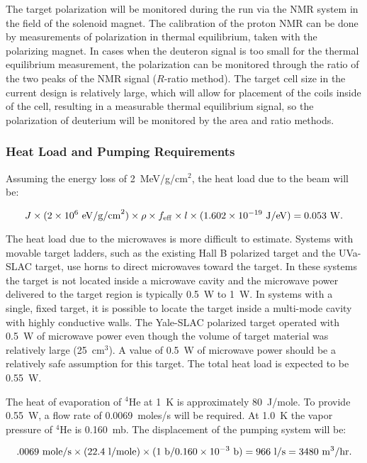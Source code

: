 The target polarization will be monitored during the run via the NMR system 
in the field of the solenoid magnet. The calibration of the proton NMR can be 
done by measurements of polarization in thermal equilibrium, taken with the 
polarizing magnet. In cases when the deuteron signal is too small for the 
thermal equilibrium measurement, the polarization can be monitored through 
the ratio of the two peaks of the NMR signal ($R$-ratio method).  The target 
cell size in the current design is relatively large, which will allow for 
placement of the coils inside of the cell, resulting in a measurable thermal 
equilibrium signal, so the polarization of deuterium will be monitored by 
the area and ratio methods.

\subsubsection{Heat Load and Pumping Requirements}

Assuming the energy loss of 2~MeV/g/cm$^2$, the heat load due to the beam 
will be:

\begin{equation}
J \times (2\times10^6~{\rm eV/g/cm}^2)\times \rho \times f_{\rm eff}
\times l \times (1.602\times 10^{-19}~{\rm J/eV}) = 0.053~{\rm W}.
\end{equation}

The heat load due to the microwaves is more difficult to estimate. Systems 
with movable target ladders, such as the existing Hall B polarized target 
and the UVa-SLAC target, use horns to direct microwaves toward the target. 
In these systems the target is not located inside a microwave cavity and 
the microwave power delivered to the target region is typically 0.5~W to 1~W. 
In systems with a single, fixed target, it is possible to locate the target 
inside a multi-mode cavity with highly conductive walls.  The Yale-SLAC 
polarized target operated with 0.5~W of microwave power even though the 
volume of target material was relatively large (25~cm$^3$).  A value of 0.5~W 
of microwave power should be a relatively safe assumption for this target.
The total heat load is expected to be 0.55~W.

The heat of evaporation of $^4$He at 1~K is approximately 80~J/mole.  To 
provide 0.55~W, a flow rate of 0.0069~moles/s will be required.  At 1.0~K 
the vapor pressure of $^4$He is 0.160~mb.  The displacement of the pumping 
system will be:

\begin{equation}
.0069~{\rm mole/s} \times (22.4~{\rm l/mole})\times (1~{\rm b}/0.160 
\times 10^{-3}~{\rm b}) = 966~{\rm l/s} = 3480~{\rm m}^3/{\rm hr}.
\end{equation}

